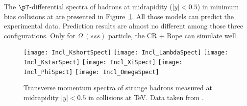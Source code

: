 \documentclass[ALICE,manyauthors]{StrinJet}
\begin{document}
The $\pT$-differential spectra of hadrons at midrapidity ($|y| < 0.5$) in minimum bias \pp collisions at \seven are presented in Figure~\ref{fig:InclParSpect}. All those models can predict the experimental data. Prediction results are almost no different among those three configurations. Only for $\Omega~(sss)$ particle, the CR + Rope can simulate well.
\begin{figure}[ht]
	\begin{center}
		\texttt{[image: Incl\_KshortSpect]}
		\texttt{[image: Incl\_LambdaSpect]}
		\texttt{[image: Incl\_KstarSpect]}
		\texttt{[image: Incl\_XiSpect]}
		\texttt{[image: Incl\_PhiSpect]}
		\texttt{[image: Incl\_OmegaSpect]}
	\end{center}
	\caption{Transverse momentum spectra of strange hadrons measured at midrapidity $|y| < 0.5$ in \pp collisions at \seven TeV. Data taken from \cite{ALICE:2020jsh, Basak:2012jy, ALICE:2019hyb}.}
	\label{fig:InclParSpect}
\end{figure}

\end{document}
